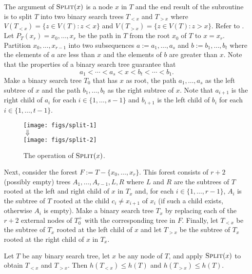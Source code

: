 \documentclass[10pt, conference, compsocconf]{IEEEtran}
\let\le\leqslant
\begin{document}
The argument of $\textsc{Split}(x)$ is a node $x$ in $T$ and the end result of the subroutine is to split $T$ into two binary search trees $T_{<x}$ and $T_{>x}$ where $V(T_{<x})=\{z\in V(T): z<x\}$ and $V(T_{>x})=\{z\in V(T): z>x\}$. Refer to .  Let $P_T(x_r)=x_0,\dots,x_r$ be the path in $T$ from the root $x_0$ of $T$ to $x=x_r$.  Partition $x_0,\dots,x_{r-1}$ into two subsequences $a:=a_1,\dots,a_s$ and $b:=b_1,\dots,b_t$ where the elements of $a$ are less than $x$ and the elements of $b$ are greater than $x$.
Note that the properties of a binary search tree guarantee that
\[
a_1 < \cdots < a_s < x < b_t < \cdots < b_1.
\]
Make a binary search tree $T_0$ that has $x$ as root, the path $a_1,\dots,a_s$ as the left subtree of $x$ and the path $b_1,\dots,b_t$ as the right subtree of $x$.  Note that $a_{i+1}$ is the right child of $a_i$ for each $i\in\{1,\dots,s-1\}$ and $b_{i+1}$ is the left child of $b_i$ for each $i\in\{1,\dots,t-1\}$.

\begin{figure}
  \begin{center}
    \texttt{[image: figs/split-1]} \\[1ex]
    $\Downarrow$ \\[1ex]
    \texttt{[image: figs/split-2]}
  \end{center}
  \caption{The operation of $\textsc{Split}(x)$.}
\end{figure}

Next, consider the forest $F:=T-\{x_0,\dots,x_r\}$. This forest consists of $r+2$ (possibly empty) trees $A_1,\dots,A_{r-1},L,R$ where $L$ and $R$ are the subtrees of $T$ rooted at the left and right child of $x$ in $T_x$ and, for each $i\in\{1,\dots,r-1\}$, $A_i$ is the subtree of $T$ rooted at the child $c_i\neq x_{i+1}$ of $x_i$ (if such a child exists, otherwise $A_i$ is empty).  Make a binary search tree $T_x$ by replacing each of the $r+2$ external nodes of $T_0^+$ with the corresponding tree in $F$.  Finally, let $T_{<x}$ be the subtree of $T_x$ rooted at the left child of $x$ and let $T_{>x}$ be the subtree of $T_x$ rooted at the right child of $x$ in $T_x$.

\begin{lem}
  Let $T$ be any binary search tree, let $x$ be any node of $T$, and apply $\textsc{Split}(x)$ to obtain $T_{<x}$ and $T_{>x}$.
  Then $h(T_{<x})\le h(T)$ and $h(T_{>x})\le h(T)$.
\end{lem}
\end{document}
